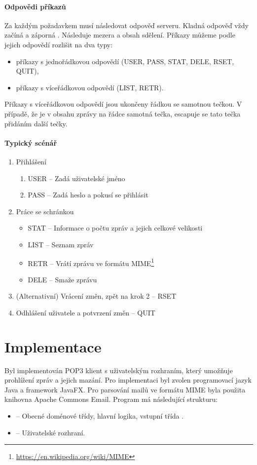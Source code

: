 \documentclass[12pt, a4paper]{article}
\begin{document}
\paragraph{Odpovědi příkazů}
Za každým požadavkem musí následovat odpověď serveru. Kladná odpověď vždy začíná  a záporná . Následuje mezera a obsah sdělení.
Příkazy můžeme podle jejich odpovědí rozlišit na dva typy:
\begin{itemize}
	\item příkazy s jednořádkovou odpovědí (USER, PASS, STAT, DELE, RSET, QUIT),
	\item příkazy s víceřádkovou odpovědí (LIST, RETR).
\end{itemize}
Příkazy s víceřádkovou odpovědí jsou ukončeny řádkou se samotnou tečkou.
V případě, že je v obsahu zprávy na řádce samotná tečka, escapuje se tato tečka přidáním další tečky.

\paragraph{Typický scénář}
\begin{enumerate}
	\item Přihlášení
	\begin{enumerate}
		\item USER -- Zadá uživatelské jméno
		\item PASS -- Zadá heslo a pokusí se přihlásit
	\end{enumerate}
	\item Práce se schránkou
	\begin{itemize}
		\item STAT -- Informace o počtu zpráv a jejich celkové velikosti
		\item LIST -- Seznam zpráv
		\item RETR -- Vrátí zprávu ve formátu MIME\footnote{\url{https://en.wikipedia.org/wiki/MIME}}
		\item DELE -- Smaže zprávu
	\end{itemize}
	\item (Alternativní) Vrácení změn, zpět na krok 2 – RSET
	\item Odhlášení uživatele a potvrzení změn -- QUIT
\end{enumerate}


\section*{Implementace}
Byl implementován POP3 klient s uživatelským rozhraním, který umožňuje prohlížení zpráv a jejich mazání.
Pro implementaci byl zvolen programovací jazyk Java a framework JavaFX.
Pro parsování mailů ve formátu MIME byla použita knihovna Apache Commons Email. 
Program má následující strukturu:
\begin{itemize}
	\item {} -- Obecné doménové třídy, hlavní logika, vstupní třída .
	\item {} -- Uživatelské rozhraní.
\end{itemize}
\end{document}
